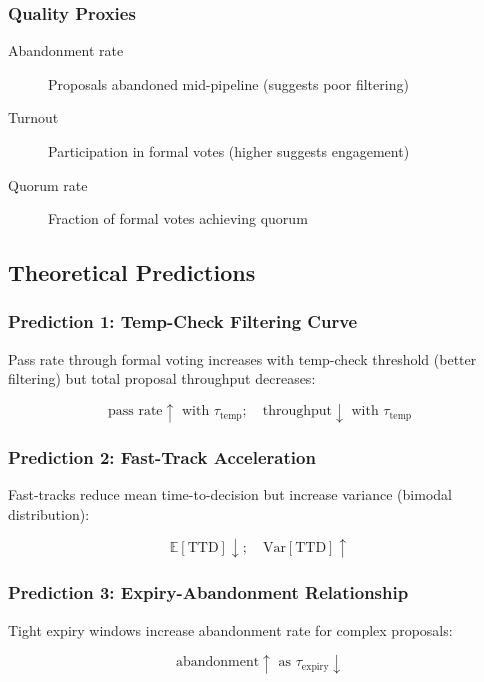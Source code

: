\subsubsection{Quality Proxies}

\begin{description}
    \item[Abandonment rate] Proposals abandoned mid-pipeline (suggests poor filtering)
    \item[Turnout] Participation in formal votes (higher suggests engagement)
    \item[Quorum rate] Fraction of formal votes achieving quorum
\end{description}

\subsection{Theoretical Predictions}

\subsubsection{Prediction 1: Temp-Check Filtering Curve}

Pass rate through formal voting increases with temp-check threshold (better filtering) but total proposal throughput decreases:

\begin{equation}
\text{pass rate} \uparrow \text{ with } \tau_{\text{temp}}; \quad \text{throughput} \downarrow \text{ with } \tau_{\text{temp}}
\end{equation}

\subsubsection{Prediction 2: Fast-Track Acceleration}

Fast-tracks reduce mean time-to-decision but increase variance (bimodal distribution):

\begin{equation}
\mathbb{E}[\text{TTD}] \downarrow; \quad \text{Var}[\text{TTD}] \uparrow
\end{equation}

\subsubsection{Prediction 3: Expiry-Abandonment Relationship}

Tight expiry windows increase abandonment rate for complex proposals:

\begin{equation}
\text{abandonment} \uparrow \text{ as } \tau_{\text{expiry}} \downarrow
\end{equation}
